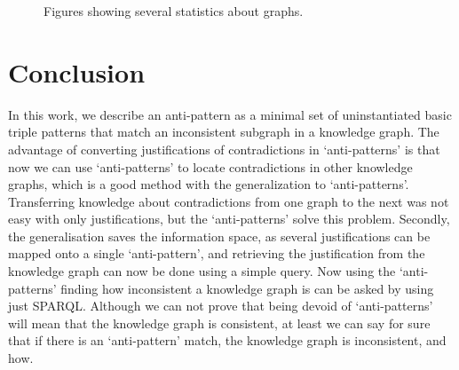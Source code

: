 \documentclass[11pt,letterpaper ,oneside ]{book}
\begin{document}
\begin{figure}[!t]
	\caption{Figures showing several statistics about graphs.}
	\label{fig:GraphStats}
\end{figure}

	
	\newpage
	
	
	\chapter{Conclusion}\label{Conclusion}
	In this work, we describe an anti-pattern as a minimal set of uninstantiated basic triple patterns that match an inconsistent subgraph in a knowledge graph. The advantage of converting justifications of contradictions in `anti-patterns' is that now we can use `anti-patterns' to locate contradictions in other knowledge graphs, which is a good method with the generalization to `anti-patterns'. Transferring knowledge about contradictions from one graph to the next was not easy with only justifications, but the `anti-patterns' solve this problem. 
	Secondly, the generalisation saves the information space, as several justifications can be mapped onto a single `anti-pattern', and retrieving the justification from the knowledge graph can now be done using a simple query. Now using the `anti-patterns' finding how inconsistent a knowledge graph is can be asked by using just SPARQL. Although we can not prove that being devoid of `anti-patterns' will mean that the knowledge graph is consistent, at least we can say for sure that if there is an `anti-pattern' match, the knowledge graph is inconsistent, and how.  \\
	
\end{document}

